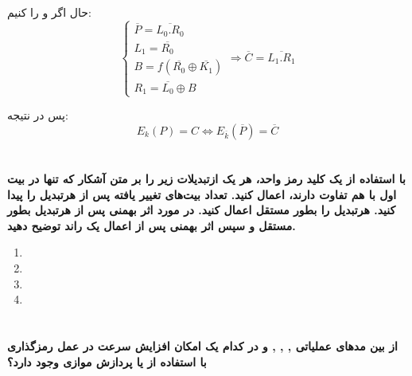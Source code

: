 \documentclass{article}
\begin{document}
\begin{enumerate}[label=\alph*)]
حال اگر 
و 
را 
کنیم:
\begin{equation}
\begin{cases}
\overline{P} = \overline{L_0.R_0}\\
L_1 = \overline{R_0} \\
B = f(\overline{R_0} \oplus \overline{K_1}) \\
R_1 = \overline{L_0} \oplus B
\end{cases}
\Rightarrow \overline{C} = \overline{L_1.R_1}
\end{equation}

پس در نتیجه:
\begin{equation}
E_k(P) = C \iff E_{\overline{k}}(\overline{P}) = \overline{C}
\end{equation}
\end{enumerate}

\section{}
{\large \textbf{با استفاده از یک کلید رمز واحد، هر یک ازتبدیلات زیر را بر متن آشکار که تنها در بیت اول با هم تفاوت دارند، اعمال کنید. تعداد بیت‌های تغییر یافته پس از هرتبدیل را پیدا کنید. هرتبدیل را بطور مستقل اعمال کنید. در مورد اثر بهمنی پس از هرتبدیل بطور مستقل و سپس اثر بهمنی پس از اعمال یک راند توضیح دهید.}}

\begin{enumerate}[label=\alph*)]
\item {}
\item {}
\item {}
\item {}
\end{enumerate}

\section{}
{\large \textbf{از بین مدهای عملیاتی
,
,
,
و
در کدام یک امکان افزایش سرعت در عمل رمزگذاری با استفاده از
یا پردازش موازی وجود دارد؟}}
\end{document}
